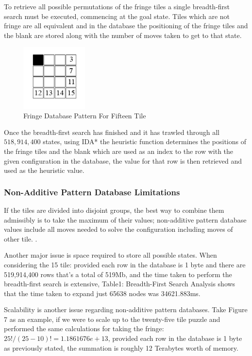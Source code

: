 \documentclass[final]{cmpreport}
\begin{document}
To retrieve all possible permutations of the fringe tiles a single breadth-first search must be executed, commencing at the goal state. Tiles which are not fringe are all equivalent and in the database the positioning of the fringe tiles and the blank are stored along with the number of moves taken to get to that state.

\begin{figure}[ht]
	\centering
	\includegraphics[width=0.30\textwidth]{fringe}
	\captionsetup{justification=centering}
	\caption{Fringe Database Pattern For Fifteen Tile}
\end{figure}

Once the breadth-first search has finished and it has trawled through all $518,914,400$ states, using IDA* the heuristic function determines the positions of the fringe tiles and the blank which are used as an index to the row with the given configuration in the database, the value for that row is then retrieved and used as the heuristic value.

\subsubsection{Non-Additive Pattern Database Limitations}
If the tiles are divided into disjoint groups, the best way to combine them admissibly is to take the maximum of their values; non-additive pattern database values include all moves needed to solve the configuration including moves of other tile. \citep{DBLP:journals/corr/abs-1107-0050}.

Another major issue is space required to store all possible states. When considering the 15 tile: provided each row in the database is 1 byte and there are 519,914,400 rows that's a total of 519Mb, and the time taken to perform the breadth-first search is extensive, Table1: Breadth-First Search Analysis shows that the time taken to expand just 65638 nodes was 34621.883ms.

Scalability is another issue regarding non-additive pattern databases. Take Figure 7 as an example, if we were to scale up to the twenty-five tile puzzle and performed the same calculations for taking the fringe: $25!/(25-10)!=1.1861676e+13$, provided each row in the database is 1 byte as previously stated, the summation is roughly 12 Terabytes worth of memory.
\end{document}
